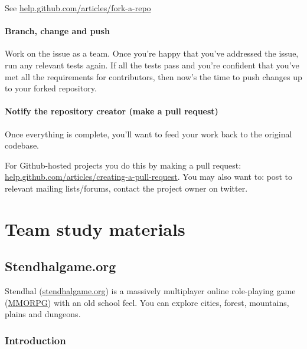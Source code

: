 \documentclass[
]{book}
\begin{document}
See \href{https://help.github.com/articles/fork-a-repo/}{help.github.com/articles/fork-a-repo}

\hypertarget{bcp}{%
\subsection{Branch, change and push}\label{bcp}}

Work on the issue as a team. Once you're happy that you've addressed the issue, run any relevant tests again. If all the tests pass and you're confident that you've met all the requirements for contributors, then now's the time to push changes up to your forked repository.

\hypertarget{pullrequest}{%
\subsection{Notify the repository creator (make a pull request)}\label{pullrequest}}

Once everything is complete, you'll want to feed your work back to the original codebase.

For Github-hosted projects you do this by making a pull request: \href{https://help.github.com/articles/creating-a-pull-request}{help.github.com/articles/creating-a-pull-request}. You may also want to: post to relevant mailing lists/forums, contact the project owner on twitter.

\hypertarget{part-team-study-materials}{%
\part{Team study materials}\label{part-team-study-materials}}

\hypertarget{starting}{%
\chapter{Stendhalgame.org}\label{starting}}

Stendhal (\href{https://stendhalgame.org/}{stendhalgame.org}) is a massively multiplayer online role-playing game (\href{https://en.wikipedia.org/wiki/Massively_multiplayer_online_role-playing_game}{MMORPG}) with an old school feel. You can explore cities, forest, mountains, plains and dungeons.

\hypertarget{introduction-2}{%
\section{Introduction}\label{introduction-2}}
\end{document}
